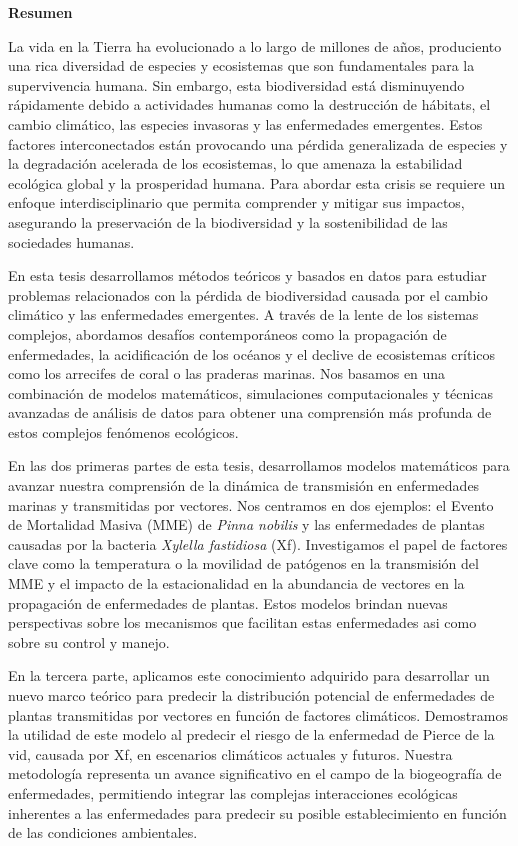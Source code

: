 \pagebreak
\thispagestyle{empty}

\begin{center}
    \textbf{\Large Resumen}
\end{center}

La vida en la Tierra ha evolucionado a lo largo de millones de años,
produciento una rica diversidad de especies y ecosistemas que
son fundamentales para la supervivencia humana. Sin embargo, esta biodiversidad
está disminuyendo rápidamente debido a actividades humanas como la destrucción
de hábitats, el cambio climático, las especies invasoras y las enfermedades
emergentes. Estos factores interconectados están provocando una pérdida
generalizada de especies y la degradación acelerada de los ecosistemas, lo que
amenaza la estabilidad ecológica global y la prosperidad humana. Para abordar
esta crisis se requiere un enfoque interdisciplinario que permita comprender y
mitigar sus impactos, asegurando la preservación de la biodiversidad y la
sostenibilidad de las sociedades humanas.

En esta tesis desarrollamos métodos teóricos y basados en datos para estudiar
problemas relacionados con la pérdida de biodiversidad causada por el cambio
climático y las enfermedades emergentes. A través de la lente de los sistemas
complejos, abordamos desafíos contemporáneos como la propagación de
enfermedades, la acidificación de los océanos y el declive de ecosistemas
críticos como los arrecifes de coral o las praderas marinas. Nos basamos en una
combinación de modelos matemáticos, simulaciones computacionales y técnicas
avanzadas de análisis de datos para obtener una comprensión más profunda de
estos complejos fenómenos ecológicos.

En las dos primeras partes de esta tesis, desarrollamos modelos matemáticos
para avanzar nuestra comprensión de la dinámica de transmisión en enfermedades
marinas y transmitidas por vectores. Nos centramos en dos ejemplos: el Evento
de Mortalidad Masiva (MME) de \textit{Pinna nobilis} y las enfermedades de
plantas causadas por la bacteria \textit{Xylella fastidiosa} (Xf). Investigamos
el papel de factores clave como la temperatura o la movilidad de patógenos en
la transmisión del MME y el impacto de la estacionalidad en la abundancia de
vectores en la propagación de enfermedades de plantas. Estos modelos brindan
nuevas perspectivas sobre los mecanismos que facilitan estas enfermedades asi
como sobre su control y manejo.

En la tercera parte, aplicamos este conocimiento adquirido para desarrollar un
nuevo marco teórico para predecir la distribución potencial de enfermedades de
plantas transmitidas por vectores en función de factores climáticos.
Demostramos la utilidad de este modelo al predecir el riesgo de la
enfermedad de Pierce de la vid, causada por Xf, en escenarios climáticos
actuales y futuros. Nuestra metodología representa un avance significativo en
el campo de la biogeografía de enfermedades, permitiendo integrar las complejas
interacciones ecológicas inherentes a las enfermedades para predecir su posible
establecimiento en función de las condiciones ambientales.

